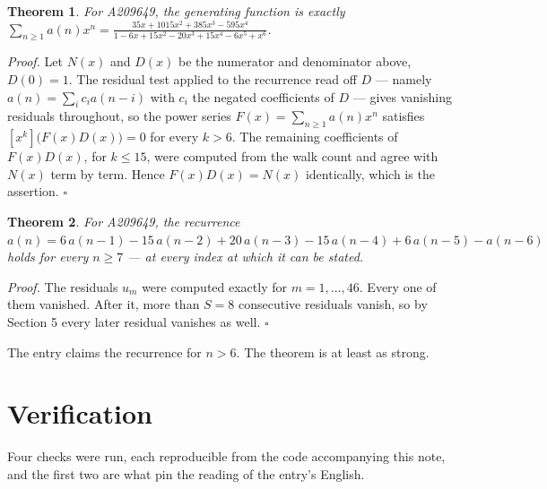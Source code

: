 \documentclass[11pt]{article}
\newtheorem{theorem}{Theorem}
\theoremstyle{definition}
\begin{document}
\begin{theorem} For A209649, the generating function is exactly $\sum_{n\ge 1} a(n)x^n = \frac{35x + 1015x^{2} + 385x^{3} - 595x^{4}}{1 - 6x + 15x^{2} - 20x^{3} + 15x^{4} - 6x^{5} + x^{6}}$.\end{theorem}

{\itshape Proof.} Let $N(x)$ and $D(x)$ be the numerator and denominator above, $D(0)=1$. The residual test applied to the recurrence read off $D$ --- namely $a(n) = \sum_i c_i a(n-i)$ with $c_i$ the negated coefficients of $D$ --- gives vanishing residuals throughout, so the power series $F(x)=\sum_{n\ge 1}a(n)x^n$ satisfies $[x^k]\bigl(F(x)D(x)\bigr) = 0$ for every $k > 6$. The remaining coefficients of $F(x)D(x)$, for $k \le 15$, were computed from the walk count and agree with $N(x)$ term by term. Hence $F(x)D(x) = N(x)$ identically, which is the assertion. $\square$

\begin{theorem} For A209649, the recurrence $a(n) = 6\,a(n-1) - 15\,a(n-2) + 20\,a(n-3) - 15\,a(n-4) + 6\,a(n-5) - a(n-6)$ holds for every $n \ge 7$ --- at every index at which it can be stated.\end{theorem}

{\itshape Proof.} The residuals $u_m$ were computed exactly for $m = 1,\dots,46$. Every one of them vanished. After it, more than $S = 8$ consecutive residuals vanish, so by Section 5 every later residual vanishes as well. $\square$

The entry claims the recurrence for $n > 6$. The theorem is at least as strong.

\section{Verification}

Four checks were run, each reproducible from the code accompanying this note, and the first two are what pin the reading of the entry's English.
\end{document}

